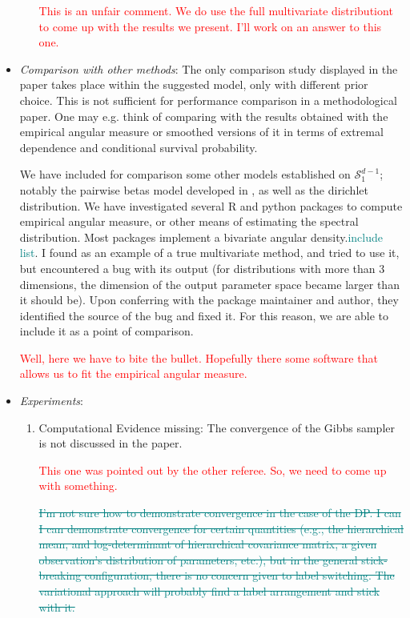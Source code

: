 \documentclass[10pt]{article}
\newcommand{\comment}[1]{\textcolor{teal}{#1}}
\newcommand{\bruno}[1]{\textcolor{red}{#1}}
\begin{document}
\begin{itemize}
\begin{enumerate}
        \bruno{This is an unfair comment. We do use the full multivariate distributiont to come up
        with the results we present. I'll work on an answer to this one.}
    \end{enumerate}

\item \emph{Comparison with other methods}: The only comparison study displayed in the paper 
    takes place within the suggested model, only with different prior choice. This is not sufficient 
    for performance comparison in a methodological paper. One may e.g. think of comparing with the
    results obtained with the empirical angular measure or smoothed versions of it in terms of 
    extremal dependence and conditional survival probability.

    We have included for comparison some other models established on $\mathcal{S}_{1}^{d-1}$;
        notably the pairwise betas model developed in \cite{sabourin2013}, as well
        as the dirichlet distribution.  We have investigated several R and python packages to
        compute empirical angular measure, or other means of estimating the spectral distribution.
        Most packages implement a bivariate angular density.\comment{include list}.  I found 
        \cite{BMAmevt} as an example of a true multivariate method, and tried to use it, but
        encountered a bug with its output (for distributions with more than 3 dimensions, the
        dimension of the output parameter space became larger than it should be).  Upon 
        conferring with the package maintainer and author, they identified the source of the
        bug and fixed it.  For this reason, we are able to include it as a point of comparison.
    
    \bruno{Well, here we have to bite the bullet. Hopefully there some software that allows us
    to fit the empirical angular measure.}

    \item \emph{Experiments}:
        \begin{enumerate}
            \item Computational Evidence missing: The convergence of the Gibbs sampler is not 
            discussed in the paper.

            \bruno{This one was pointed out by the other referee. So, we need to come up with something.}

            \comment{\st{I'm not sure how to demonstrate convergence in the case of the DP.  I can
            I can demonstrate convergence for certain quantities (e.g., the hierarchical mean,
            and log-determinant of hierarchical covariance matrix, a given observation's distribution
            of parameters, etc.), but in the general stick-breaking configuration, there is no concern
            given to label switching.  The variational approach will probably find a label arrangement
            and stick with it.}}


\end{enumerate}
\end{itemize}
\end{document}
